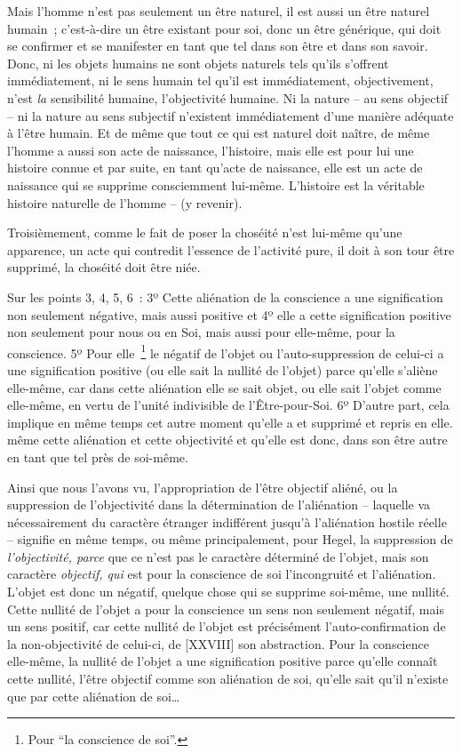 \documentclass[french,twoside]{book} %
\begin{document}
Mais l’homme n’est pas seulement un être naturel, il est aussi un être naturel humain ; c’est-à-dire un être existant pour soi, donc un être générique, qui doit se confirmer et se manifester en tant que tel dans son être et dans son savoir. Donc, ni les objets humains ne sont objets naturels tels qu’ils s’offrent immédiatement, ni le sens humain tel qu’il est immédiatement, objectivement, n’est \emph{la} sensibilité humaine, l’objectivité humaine. Ni la nature – au sens objectif – ni la nature au sens subjectif n’existent immédiatement d’une manière adéquate à l’être humain. Et de même que tout ce qui est naturel doit naître, de même l’homme a aussi son acte de naissance, l’histoire, mais elle est pour lui une histoire connue et par suite, en tant qu’acte de naissance, elle est un acte de naissance qui se supprime consciemment lui-même. L’histoire est la véritable histoire naturelle de l’homme – (y revenir).\par
Troisièmement, comme le fait de poser la choséité n’est lui-même qu’une apparence, un acte qui contredit l’essence de l’activité pure, il doit à son tour être supprimé, la choséité doit être niée.\par
Sur les points 3, 4, 5, 6 : 3º Cette aliénation de la conscience a une signification non seulement négative, mais aussi positive et 4º elle a cette signification positive non seulement pour nous ou en Soi, mais aussi pour elle-même, pour la conscience. 5º Pour elle \footnote{Pour “la conscience de soi”.} le négatif de l’objet ou l’auto-suppression de celui-ci a une signification positive (ou elle sait la nullité de l’objet) parce qu’elle s’aliène elle-même, car dans cette aliénation elle se sait objet, ou elle sait l’objet comme elle-même, en vertu de l’unité indivisible de l’Être-pour-Soi. 6º D’autre part, cela implique en même temps cet autre moment qu’elle a et supprimé et repris en elle. même cette aliénation et cette objectivité et qu’elle est donc, dans son être autre en tant que tel près de soi-même.\par
Ainsi que nous l’avons vu, l’appropriation de l’être objectif aliéné, ou la suppression de l’objectivité dans la détermination de l’aliénation – laquelle va nécessairement du caractère étranger indifférent jusqu’à l’aliénation hostile réelle – signifie en même temps, ou même principalement, pour Hegel, la suppression de \emph{l’objectivité, parce} que ce n’est pas le caractère déterminé de l’objet, mais son caractère \emph{objectif, qui} est pour la conscience de soi l’incongruité et l’aliénation. L’objet est donc un négatif, quelque chose qui se supprime soi-même, une nullité. Cette nullité de l’objet a pour la conscience un sens non seulement négatif, mais un sens positif, car cette nullité de l’objet est précisément l’auto-confirmation de la non-objectivité de celui-ci, de [XXVIII] son abstraction. Pour la conscience elle-même, la nullité de l’objet a une signification positive parce qu’elle connaît cette nullité, l’être objectif comme son aliénation de soi, qu’elle sait qu’il n’existe que par cette aliénation de soi…\par
\end{document}
